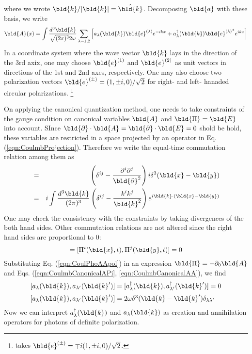 where we wrote $\bld{k} / |\bld{k}| = \hat{\bld{k}}$.
Decomposing $\bld{a}$ with these basis, we write
\begin{eqnarray}
\bld{A}(x) = \int \frac{d^3 \bld{k}}{\sqrt{(2\pi)^3}2\omega} 
\sum_{\lambda = 1, 2}
\left[
a_\lambda (\bld{k}) \bld{e}^{(\lambda)} e^{-i k x} 
+ 
a_\lambda^{\dagger}(\bld{k}) {\bld{e}^{(\lambda)}}^* e^{i k x} 
\right]
\label{eqn:CoulPhoAApol}
\end{eqnarray}
In a coordinate system where the wave vector $\bld{k}$ lays in the direction of the
3rd axix,
one may choose $\bld{e}^{(1)}$ and $\bld{e}^{(2)}$ as unit vectors in directions of
the 1st and 2nd axes, respectively. One may also choose two polarization vectors
$\bld{e}^{(\pm)} =  (1, \pm i , 0)/\sqrt{2}$  for right- and left- hanaded circular
polarizations.
\footnote{%
\cite{ref:Lifshitz} takes
$\bld{e}^{(\pm)} = \mp i (1, \pm i , 0)/\sqrt{2}$.
}%

On applying the canonical quantization method,
one needs to take constraints of the gauge condition on canonical
variables $\bld{A}$ and $\bld{\Pi} = \bld{E}$ into account.
SInce $\bld{\partial}\cdot \bld{A} = \bld{\partial}\cdot \bld{E} = 0$ shold
be hold, these variables are restricted in a space projected by
an operator in Eq. (\ref{eqn:CoulmbProjection}). Therefore we write
the equal-time commutation relation among them as
\begin{eqnarray}
[ A^i (\bld{x}, t), \Pi^j (\bld{y}, t) ]
&=&
\left(
\delta^{ij}
-
\frac{\partial^i \partial^j}
{\bld{\partial}^2}
\right)
i \delta^3 (\bld{x} - \bld{y})
\nonumber\\
&=&
i \int \frac{d^3 \bld{k}}{(2\pi)^3}
\left(
\delta^{ij}
-
\frac{k^i k^j}{\bld{k}^2}
\right)
e^{i \bld{k} \cdot (\bld{x} - \bld{y})}
\label{eqn:CoulmbCanonicalAPi}
\end{eqnarray}
One may check the consistency with the constraints by taking 
divergences of the both hand sides.
Other commutation relations are not altered since the right hand sides are
proportional to 0:
\begin{eqnarray}
[ A^i (\bld{x}, t), A^j (\bld{y}, t) ]
=
[ \Pi^i (\bld{x}, t), \Pi^j (\bld{y}, t) ]
=
0
\label{eqn:CoulmbCanonicalAA}
\end{eqnarray}
Substituting Eq. (\ref{eqn:CoulPhoAApol}) in an expression
$\bld{\Pi} = - \partial_0 \bld{A}$ and Eqs. (\ref{eqn:CoulmbCanonicalAPi}, \ref{eqn:CoulmbCanonicalAA}),
we find
\begin{eqnarray}
\begin{array}{l}
[a_\lambda(\bld{k}), a_{\lambda '}(\bld{k}')]
=
[a^\dagger_\lambda(\bld{k}), a^\dagger_{\lambda '}(\bld{k}')]
=0
\vspace{2mm}
\\
{[}a_\lambda (\bld{k}), a_{\lambda '} (\bld{k}'){]}
=
2 \omega \delta^3(\bld{k} - \bld{k}') \delta_{\lambda \lambda'}
\end{array}
\end{eqnarray}
Now we can interpret $a^\dagger_\lambda (\bld{k})$ and $a_\lambda (\bld{k})$
as creation and annihilation operators for photons of definite polarization.

